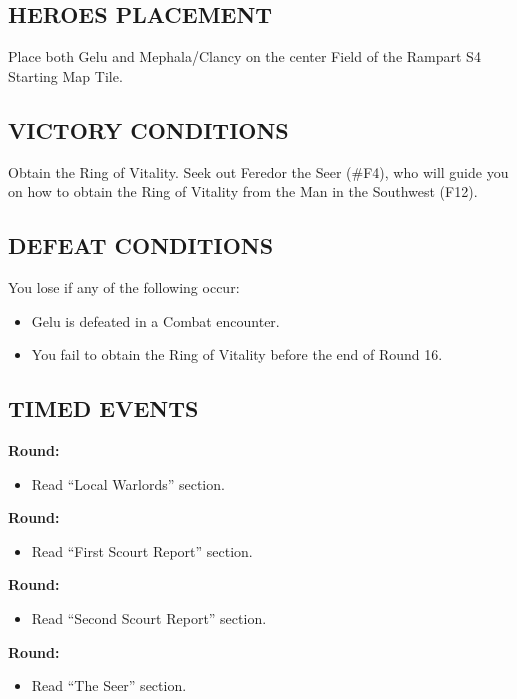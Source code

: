 \begin{multicols*}{2}
\subsection*{\MakeUppercase{Heroes Placement}}

Place both Gelu and Mephala/Clancy on the center Field of the Rampart S4 Starting Map Tile.

\subsection*{\MakeUppercase{Victory Conditions}}

Obtain the Ring of Vitality.
Seek out Feredor the Seer (\#F4), who will guide you on how to obtain the Ring of Vitality from the Man in the Southwest (F12).

\subsection*{\MakeUppercase{Defeat Conditions}}

You lose if any of the following occur:
\begin{itemize}
  \item Gelu is defeated in a Combat encounter.
  \item You fail to obtain the Ring of Vitality before the end of Round 16.
\end{itemize}

\subsection*{\MakeUppercase{Timed Events}}

\textbf{ Round:}
\begin{itemize}
  \item Read ``Local Warlords'' section.
\end{itemize}

\textbf{ Round:}
\begin{itemize}
  \item Read ``First Scourt Report'' section.
\end{itemize}

\textbf{ Round:}
\begin{itemize}
  \item Read ``Second Scourt Report'' section.
\end{itemize}

\textbf{ Round:}
\begin{itemize}
  \item Read ``The Seer'' section.
\end{itemize}


\end{multicols*}
